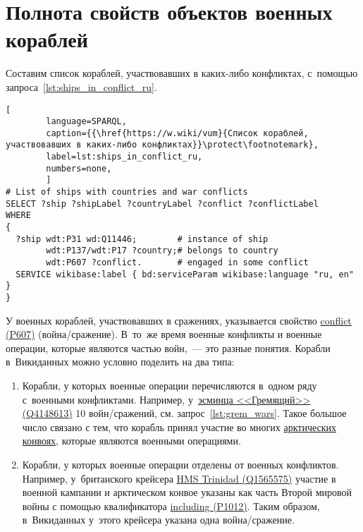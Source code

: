 \section{Полнота свойств объектов военных кораблей}

Составим список кораблей, участвовавших в каких-либо конфликтах, 
с~помощью запроса~\ref{lst:ships_in_conflict_ru}.

\begin{lstlisting}[ 
        language=SPARQL, 
        caption={{\href{https://w.wiki/vum}{Список кораблей, участвовавших в каких-либо конфликтах}}\protect\footnotemark}, 
        label=lst:ships_in_conflict_ru, 
        numbers=none,
        ]
# List of ships with countries and war conflicts
SELECT ?ship ?shipLabel ?countryLabel ?conflict ?conflictLabel
WHERE
{
  ?ship wdt:P31 wd:Q11446;        # instance of ship
        wdt:P137/wdt:P17 ?country;# belongs to country
        wdt:P607 ?conflict.       # engaged in some conflict
  SERVICE wikibase:label { bd:serviceParam wikibase:language "ru, en" }
}
\end{lstlisting}



\newpage
У военных кораблей, участвовавших в сражениях, 
указывается свойство 
\href{https://www.wikidata.org/wiki/Property:P607}{conflict (P607)} (война/сражение). 
В~то~же время военные конфликты и военные операции, 
которые являются частью войн,~--- это разные понятия. 
Корабли в~Викиданных можно условно поделить на два типа:

\begin{enumerate}
  \item Корабли, у которых военные операции перечисляются в~одном ряду с~военными конфликтами. 
      Например, у~\href{https://www.wikidata.org/wiki/Q4148613}{эсминца <<Гремящий>> (Q4148613)} 
        10 войн/сражений, 
        см. запрос~\ref{lst:grem_wars}. 
        Такое большое число связано с тем, 
        что корабль принял участие во многих 
        \href{https://ru.wikipedia.org/wiki/Арктические_конвои}{арктических конвоях}, 
        которые являются военными операциями.
  \item Корабли, у которых военные операции отделены от военных конфликтов. 
      Например, у~британского крейсера 
        \href{https://www.wikidata.org/wiki/Q1565575}{HMS Trinidad (Q1565575)} 
        участие в военной кампании и арктическом конвое указаны как часть Второй мировой войны 
        с помощью квалификатора 
        \href{https://www.wikidata.org/wiki/Property:P1012}{including (P1012)}. 
        Таким образом, в~Викиданных у~этого крейсера указана одна война/сра\-жение.
\end{enumerate}

